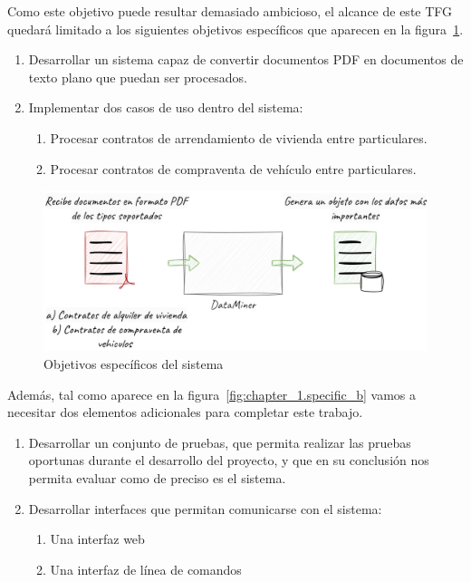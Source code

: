 Como este objetivo puede resultar demasiado ambicioso, el alcance de este TFG quedará limitado a los siguientes
objetivos específicos que aparecen en la figura~\ref{fig:chapter_1.specific_a}.

\begin{enumerate}
    \item
    Desarrollar un sistema capaz de convertir documentos PDF en documentos de texto plano que puedan ser procesados.
    \item Implementar dos casos de uso dentro del sistema:
    \begin{enumerate}
        \item Procesar contratos de arrendamiento de vivienda entre particulares.
        \item Procesar contratos de compraventa de vehículo entre particulares.
    \end{enumerate}
\end{enumerate}

\begin{figure}[ht]
    \begin{center}
        \includegraphics[width=\textwidth]{chapter/1/images/chapter_1.specific_a}
        \caption{Objetivos específicos del sistema}
        \label{fig:chapter_1.specific_a}
    \end{center}
\end{figure}

Además, tal como aparece en la figura~\ref{fig:chapter_1.specific_b} vamos a necesitar dos elementos adicionales para
completar este trabajo.

\begin{enumerate}
    \item Desarrollar un conjunto de pruebas, que permita realizar las pruebas oportunas durante el desarrollo del
    proyecto, y que en su conclusión nos permita evaluar como de preciso es el sistema.
    \item Desarrollar interfaces que permitan comunicarse con el sistema:
    \begin{enumerate}
        \item  Una interfaz web
        \item  Una interfaz de línea de comandos
    \end{enumerate}
\end{enumerate}


